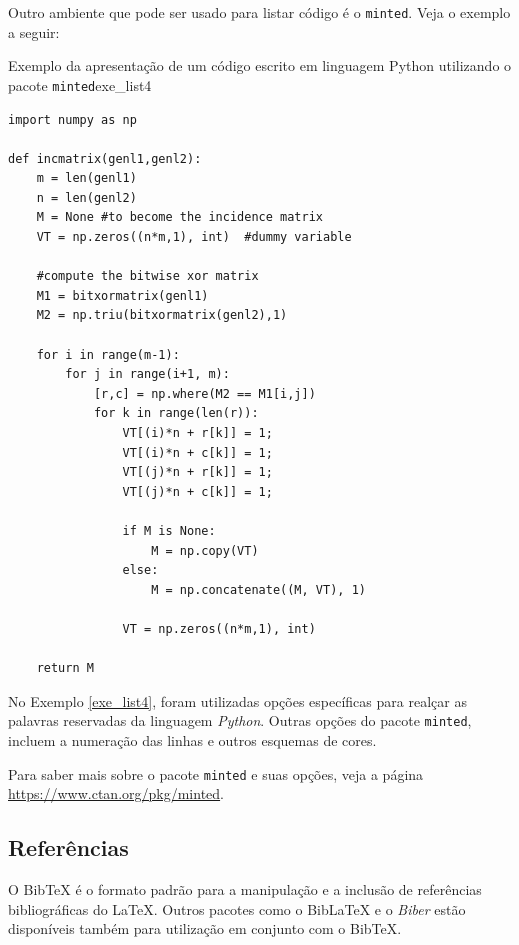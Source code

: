 Outro ambiente que pode ser usado para listar código é o {\tt minted}. Veja o exemplo a seguir:

\begin{texexptitled}[breakable,center lower,enhanced,middle=2mm,leftlower=8mm]{Exemplo da apresentação de um código escrito em linguagem Python utilizando o pacote {\tt minted}}{exe_list4}
\begin{verbatim}
import numpy as np
 
def incmatrix(genl1,genl2):
    m = len(genl1)
    n = len(genl2)
    M = None #to become the incidence matrix
    VT = np.zeros((n*m,1), int)  #dummy variable
 
    #compute the bitwise xor matrix
    M1 = bitxormatrix(genl1)
    M2 = np.triu(bitxormatrix(genl2),1) 
 
    for i in range(m-1):
        for j in range(i+1, m):
            [r,c] = np.where(M2 == M1[i,j])
            for k in range(len(r)):
                VT[(i)*n + r[k]] = 1;
                VT[(i)*n + c[k]] = 1;
                VT[(j)*n + r[k]] = 1;
                VT[(j)*n + c[k]] = 1;
 
                if M is None:
                    M = np.copy(VT)
                else:
                    M = np.concatenate((M, VT), 1)
 
                VT = np.zeros((n*m,1), int)
 
    return M
\end{verbatim}
\end{texexptitled}

No Exemplo \ref{exe_list4}, foram utilizadas opções específicas para realçar as palavras reservadas da linguagem \textit{Python}. Outras opções do pacote {\tt minted}, incluem a numeração das linhas e outros esquemas de cores.

\begin{marker}
  Para saber mais sobre o pacote {\tt minted} e suas opções, veja a página \url{https://www.ctan.org/pkg/minted}.
\end{marker}

\subsection{Referências}
\label{sec:refs}

O Bib\TeX{} é o formato padrão para a manipulação e a inclusão de referências bibliográficas do \LaTeX{}. Outros pacotes como o Bib\LaTeX{} e o \textit{Biber} estão disponíveis também para utilização em conjunto com o Bib\TeX{}.

